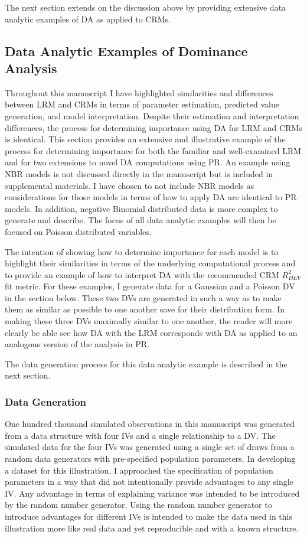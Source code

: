 \documentclass[ShortAfour,times,sageapa]{sagej}
\begin{document}
	The next section extends on the discussion above by providing extensive data analytic examples of DA as applied to CRMs. 
	
	\subsection{Data Analytic Examples of Dominance Analysis}
	
	Throughout this manuscript I have highlighted similarities and differences between LRM and CRMs in terms of parameter estimation, predicted value generation, and model interpretation.
	Despite their estimation and interpretation differences, the process for determining importance using DA for LRM and CRMs is identical.
	This section provides an extensive and illustrative example of the process for determining importance for both the familiar and well-examined LRM and for two extensions to novel DA computations using PR.
	An example using NBR models is not discussed directly in the manuscript but is included in supplemental materials.
	I have chosen to not include NBR models as considerations for those models in terms of how to apply DA are identical to PR models.
	In addition, negative Binomial distributed data is more complex to generate and describe.
	The focus of all data analytic examples will then be focused on Poisson distributed variables.
	
	The intention of showing how to determine importance for each model is to highlight their similarities in terms of the underlying computational process and to provide an example of how to interpret DA with the recommended CRM $R^2_{DEV}$ fit metric.
	For these examples, I generate data for a Gaussian and a Poisson DV in the section below.
	These two DVs are generated in such a way as to make them as similar as possible to one another save for their distribution form.
	In making these three DVs maximally similar to one another, the reader will more clearly be able see how DA with the LRM corresponds with DA as applied to an analogous version of the analysis in PR.
	
	The data generation process for this data analytic example is described in the next section.
	
		\subsubsection{Data Generation}
		
	One hundred thousand simulated observations in this manuscript was generated from a data structure with four IVs and a single relationship to a DV.
	The simulated data for the four IVs was generated using a single set of draws from a random data generators with pre-specified population parameters.
	In developing a dataset for this illustration, I approached the specification of population parameters in a way that did not intentionally provide advantages to any single IV.  
	Any advantage in terms of explaining variance was intended to be introduced by the random number generator.
	Using the random number generator to introduce advantages for different IVs is intended to make the data used in this illustration more like real data and yet reproducible and with a known structure.
	
\end{document}
